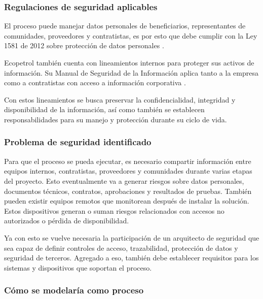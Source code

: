 \subsubsection*{Regulaciones de seguridad aplicables}

El proceso puede manejar datos personales de beneficiarios, representantes de comunidades, proveedores y contratistas, es por esto que debe cumplir con la Ley 1581 de 2012 sobre protección de datos personales \parencite{ley1581de2012}.

Ecopetrol también cuenta con lineamientos internos para proteger sus activos de información. Su Manual de Seguridad de la Información aplica tanto a la empresa como a contratistas con acceso a información corporativa \parencite{ecopetrolManualSeguridad}.

Con estos lineamientos se busca preservar la confidencialidad, integridad y disponibilidad de la información, así como también se establecen responsabilidades para su manejo y protección durante su ciclo de vida.

\subsubsection*{Problema de seguridad identificado}

Para que el proceso se pueda ejecutar, es necesario compartir información entre equipos internos, contratistas, proveedores y comunidades durante varias etapas del proyecto. Esto eventualmente va a generar riesgos sobre datos personales, documentos técnicos, contratos, aprobaciones y resultados de pruebas. También pueden existir equipos remotos que monitorean después de instalar la solución. Estos dispositivos generan o suman riesgos relacionados con accesos no autorizados o pérdida de disponibilidad.

Ya con esto se vuelve necesaria la participación de un arquitecto de seguridad que sea capaz de definir controles de acceso, trazabilidad, protección de datos y seguridad de terceros. Agregado a eso, también debe establecer requisitos para los sistemas y dispositivos que soportan el proceso.

\subsubsection*{Cómo se modelaría como proceso}

